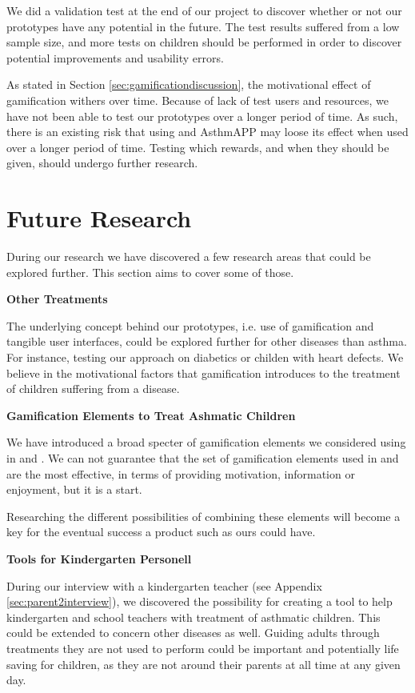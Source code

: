 We did a validation test at the end of our project to discover whether or not our prototypes have any potential in the future. The test results suffered from a low sample size, and more tests on children should be performed in order to discover potential improvements and usability errors. 

As stated in Section \ref{sec:gamificationdiscussion}, the motivational effect of gamification withers over time. Because of lack of test users and resources, we have not been able to test our prototypes over a longer period of time. As such, there is an existing risk that using \buddy{} and AsthmAPP may loose its effect when used over a longer period of time. Testing which rewards, and when they should be given, should undergo further research.   

\section{Future Research}
\label{sec:futureresearch}

During our research we have discovered a few research areas that could be explored further. This section aims to cover some of those. 

\textbf{Other Treatments}

The underlying concept behind our prototypes, i.e. use of gamification and tangible user interfaces, could be explored further for other diseases than asthma. For instance, testing our approach on diabetics or childen with heart defects. We believe in the motivational factors that gamification introduces to the treatment of children suffering from a disease. 

\textbf{Gamification Elements to Treat Ashmatic Children}

We have introduced a broad specter of gamification elements we considered using in \app{} and \ab{}. We can not guarantee that the set of gamification elements used in \app{} and \ab{} are the most effective, in terms of providing motivation, information or enjoyment, but it is a start. 

Researching the different possibilities of combining these elements will become a key for the eventual success a product such as ours could have.    


\textbf{Tools for Kindergarten Personell}

During our interview with a kindergarten teacher (see Appendix \ref{sec:parent2interview}), we discovered the possibility for creating a tool to help kindergarten and school teachers with treatment of asthmatic children. This could be extended to concern other diseases as well. Guiding adults through treatments they are not used to perform could be important and potentially life saving for children, as they are not around their parents at all time at any given day.    


